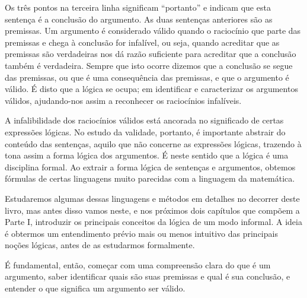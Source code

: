 

\noindent Os três pontos na terceira linha significam ``portanto'' e indicam que esta sentença é a conclusão do argumento. As duas sentenças anteriores são as premissas.
Um argumento é considerado válido quando o raciocínio que parte das premissas e chega à conclusão for infalível, ou seja, quando acreditar que as premissas são verdadeiras nos dá razão suficiente para acreditar que a conclusão também é verdadeira.
Sempre que isto ocorre dizemos que a conclusão se segue das premissas, ou que é uma consequência das premissas, e que o argumento é válido.
É disto que a lógica se ocupa; em identificar e caracterizar os argumentos válidos, ajudando-nos assim a reconhecer os raciocínios infalíveis.

A infalibilidade dos raciocínios válidos está ancorada no significado de certas expressões lógicas.
No estudo da validade, portanto, é importante abstrair do conteúdo das sentenças, aquilo que não concerne as expressões lógicas, trazendo à tona assim a forma lógica dos argumentos.
É neste sentido que a lógica é uma disciplina formal.
Ao extrair a forma lógica de sentenças e argumentos, obtemos fórmulas de certas linguagens muito parecidas com a linguagem da matemática.

Estudaremos algumas dessas linguagens e métodos em detalhes no decorrer deste livro, mas antes disso vamos neste, e nos próximos dois capítulos que compõem a Parte I, introduzir os principais conceitos da lógica de um modo informal.
A ideia é obtermos um entendimento prévio mais ou menos intuitivo das principais noções lógicas, antes de as estudarmos formalmente.

É fundamental, então, começar com uma compreensão clara do que é um argumento, saber identificar quais são suas premissas e qual é sua conclusão, e entender o que significa um argumento ser válido.



